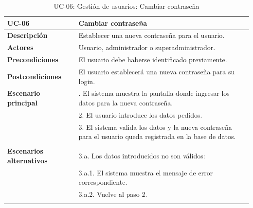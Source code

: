 \begin{table}[H]
  \begin{center}
    \begin{tabularx}{16.4cm}{|l|X|}
      \hline
      \textbf{UC-06} & \textbf{Cambiar contraseña}\\
      \hline
      \textbf{Descripción} & Establecer una nueva contraseña para el usuario.\\
      \hline
      \textbf{Actores} & Usuario, administrador o superadministrador.\\
      \hline
      \textbf{Precondiciones} & El usuario debe haberse identificado previamente.\\
      \hline
      \textbf{Postcondiciones} & El usuario establecerá una nueva contraseña para su login.\\
      \hline
      \textbf{Escenario principal} & \smallskip 1. El sistema muestra la pantalla donde ingresar los datos para la nueva contraseña.\\
      & 2. El usuario introduce los datos pedidos.\\
      & 3. El sistema valida los datos y la nueva contraseña para el usuario queda registrada en la base de datos.\\
      & \\
      \hline
      \textbf{Escenarios alternativos} & \smallskip 3.a. Los datos introducidos no son válidos:\\
      & \hspace{0.3cm} 3.a.1. El sistema muestra el mensaje de error correspondiente.\\
      & \hspace{0.3cm} 3.a.2. Vuelve al paso 2.\\
      & \\
      \hline
    \end{tabularx}
    \caption{UC-06: Gestión de usuarios: Cambiar contraseña}
    \label{tab:CU-cambiar-contrasena}
  \end{center}
\end{table}



